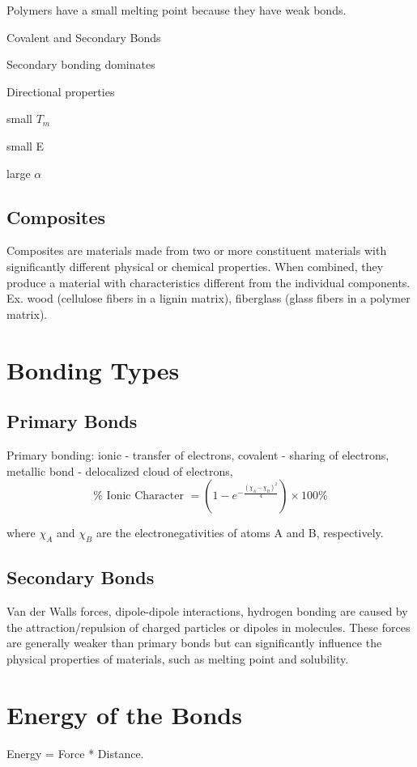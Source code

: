 \documentclass[12pt]{article}
\begin{document}
Polymers have a small melting point because they have weak bonds.

\begin{list}{Polymers}{spacing}
    \item Covalent and Secondary Bonds
    \item Secondary bonding dominates
    \item Directional properties
    \item small $T_m$
    \item small E
    \item large $\alpha$
\end{list}

\subsection{Composites}
Composites are materials made from two or more constituent materials with significantly different physical or chemical properties. 
When combined, they produce a material with characteristics different from the individual components. 
Ex. wood (cellulose fibers in a lignin matrix), fiberglass (glass fibers in a polymer matrix).

\section{Bonding Types}
\subsection{Primary Bonds}
Primary bonding: ionic - transfer of electrons, covalent - sharing of electrons, metallic bond - delocalized cloud of electrons,  
\[
\% \text{ Ionic Character } = (1 - e^{-\frac{(\chi_A - \chi_B)^2}{4}}) \times 100\%
\]

where $\chi_A$ and $\chi_B$ are the electronegativities of atoms A and B, respectively.

\subsection{Secondary Bonds}
Van der Walls forces, dipole-dipole interactions, hydrogen bonding are caused by the attraction/repulsion of charged particles or dipoles in molecules.
These forces are generally weaker than primary bonds but can significantly influence the physical properties of materials, such as melting point and solubility.

\section{Energy of the Bonds}
Energy = Force * Distance.
\end{document}
